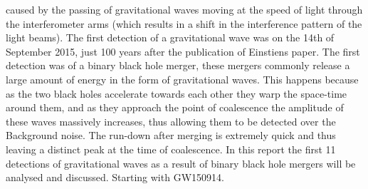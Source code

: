 \documentclass[]{article}
\begin{document}
caused by the passing of gravitational waves moving at the speed of light
through the
interferometer arms (which results in a shift in the interference pattern of the light beams).
The first detection of a gravitational wave was on the 14th of
September 2015, just 100 years after the publication of Einstiens paper.
The first detection was of a binary black hole merger, these mergers commonly
release a large amount of energy in the form of gravitational waves. This happens
because as the two black holes accelerate towards each other they warp the
space-time around them, and as they approach the point of coalescence the amplitude
of these waves massively increases, thus allowing them to be detected over the Background
noise. The run-down after merging is extremely quick and thus leaving a distinct peak
at the time of coalescence. In this report the first 11 detections of gravitational waves
as a result of binary black hole mergers will be analysed and discussed. Starting with GW150914.
\end{document}
